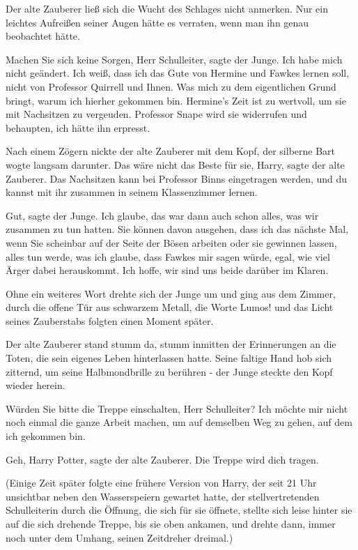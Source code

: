 Der alte Zauberer ließ sich die Wucht des Schlages nicht anmerken. Nur ein
leichtes Aufreißen seiner Augen hätte es verraten, wenn man ihn genau beobachtet
hätte.

\glqq{}Machen Sie sich keine Sorgen, Herr Schulleiter\grqq{}, sagte der Junge. \glqq{}
Ich habe mich nicht geändert. Ich weiß, dass ich das Gute von Hermine und Fawkes
lernen soll, nicht von Professor Quirrell und Ihnen. Was mich zu dem
eigentlichen Grund bringt, warum ich hierher gekommen bin. Hermine's Zeit ist zu
wertvoll, um sie mit Nachsitzen zu vergeuden. Professor Snape wird sie
widerrufen und behaupten, ich hätte ihn erpresst.\grqq{}

Nach einem Zögern nickte der alte Zauberer mit dem Kopf, der silberne Bart wogte
langsam darunter. \glqq{}Das wäre nicht das Beste für sie, Harry\grqq{}, sagte
der alte Zauberer. \glqq{}Das Nachsitzen kann bei Professor Binns eingetragen
werden, und du kannst mit ihr zusammen in seinem Klassenzimmer lernen.\grqq{}

\glqq{}Gut\grqq{}, sagte der Junge. \glqq{}Ich glaube, das war dann auch schon
alles, was wir zusammen zu tun hatten. Sie können davon ausgehen, dass ich das
nächste Mal, wenn Sie scheinbar auf der Seite der Bösen arbeiten oder sie
gewinnen lassen, alles tun werde, was ich glaube, dass Fawkes mir sagen würde,
egal, wie viel Ärger dabei herauskommt. Ich hoffe, wir sind uns beide darüber im
Klaren.\grqq{}

Ohne ein weiteres Wort drehte sich der Junge um und ging aus dem Zimmer, durch
die offene Tür aus schwarzem Metall, die Worte \glqq{}Lumos!\grqq{} und das Licht
seines Zauberstabs folgten einen Moment später.

Der alte Zauberer stand stumm da, stumm inmitten der Erinnerungen an die Toten,
die sein eigenes Leben hinterlassen hatte. Seine faltige Hand hob sich zitternd,
um seine Halbmondbrille zu berühren - der Junge steckte den Kopf wieder herein.

\glqq{}Würden Sie bitte die Treppe einschalten, Herr Schulleiter? Ich möchte mir
nicht noch einmal die ganze Arbeit machen, um auf demselben Weg zu gehen, auf
dem ich gekommen bin.\grqq{}

\glqq{}Geh, Harry Potter\grqq{}, sagte der alte Zauberer. \glqq{}Die Treppe wird
dich tragen.\grqq{}

(Einige Zeit später folgte eine frühere Version von Harry, der seit 21 Uhr
unsichtbar neben den Wasserspeiern gewartet hatte, der stellvertretenden
Schulleiterin durch die Öffnung, die sich für sie öffnete, stellte sich leise
hinter sie auf die sich drehende Treppe, bis sie oben ankamen, und drehte dann,
immer noch unter dem Umhang, seinen Zeitdreher dreimal.)

